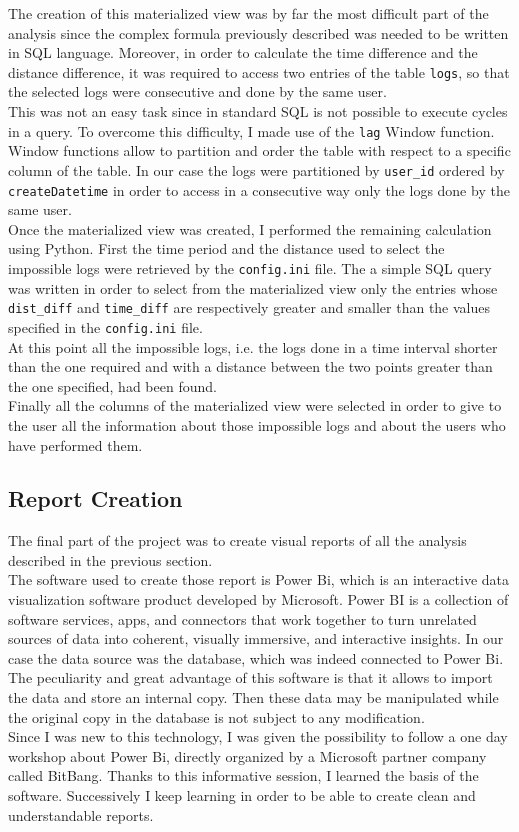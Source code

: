 \documentclass[12pt, a4paper, oneside]{article}
\begin{document}
The creation of this materialized view was by far the most difficult part of the analysis since the complex formula previously described was needed to be written
in SQL language. Moreover, in order to calculate the time difference and the distance difference, it was required to access two entries of the table \texttt{logs}, so that
the selected logs were consecutive and done by the same user. \\
This was not an easy task since in standard SQL is not possible to execute cycles in a query. To overcome this difficulty, I made use of the \texttt{lag}
Window function. Window functions allow to partition and order the table with respect to a specific column of the table. In our case the logs were partitioned
by \texttt{user\_id} ordered by \texttt{createDatetime} in order to access in a consecutive way only the logs done by the same user.\\
Once the materialized view was created, I performed the remaining calculation using Python. First the time period and the distance used to select the impossible
logs were retrieved by the \texttt{config.ini} file. The a simple SQL query was written in order to select from the materialized view only the entries whose 
\texttt{dist\_diff} and \texttt{time\_diff} are respectively greater and smaller than the values specified in the \texttt{config.ini} file.\\
At this point all the impossible logs, i.e. the logs done in a time interval shorter than the one required and with a distance between the two points greater than the one specified,
had been found.\\
Finally all the columns of the materialized view were selected in order to give to the user all the information about those impossible logs and about the users
who have performed them.

\subsection{Report Creation}
The final part of the project was to create visual reports of all the analysis described in the previous section.\\
The software used to create those report is Power Bi, which is an interactive data visualization software product developed by Microsoft. Power BI is a collection of software services,
apps, and connectors that work together to turn unrelated sources of data into coherent, visually immersive, and interactive insights.
In our case the data source was the database, which was indeed connected to Power Bi. \\
The peculiarity and great advantage of this software is that it allows to import the data and store an internal copy. Then these data may be manipulated while the original copy in the database is not
subject to any modification.\\
Since I was new to this technology, I was given the possibility to follow a one day workshop about Power Bi, directly organized by a Microsoft partner company called BitBang. Thanks to this informative
session, I learned the basis of the software. Successively I keep learning in order to be able to create clean and understandable reports.
\end{document}
